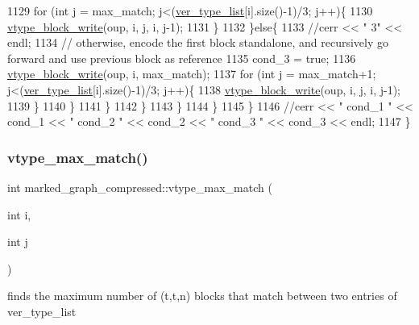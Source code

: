 \begin{DoxyCode}
1129               \textcolor{keywordflow}{for} (\textcolor{keywordtype}{int} j = max\_match; j<(\hyperlink{classmarked__graph__compressed_af2e3e55223d436628a02758dfae88493}{ver\_type\_list}[i].size()-1)/3; j++)\{
1130                 \hyperlink{classmarked__graph__compressed_a31f9ea72682f9072d0f90faf58a603fe}{vtype\_block\_write}(oup, i, j, i, j-1);
1131               \}
1132             \}\textcolor{keywordflow}{else}\{
1133               \textcolor{comment}{//cerr << " 3" << endl;}
1134               \textcolor{comment}{// otherwise, encode the first block standalone, and recursively go forward and use previous
       block as reference}
1135               cond\_3 = \textcolor{keyword}{true};
1136               \hyperlink{classmarked__graph__compressed_a31f9ea72682f9072d0f90faf58a603fe}{vtype\_block\_write}(oup, i, max\_match);
1137               \textcolor{keywordflow}{for} (\textcolor{keywordtype}{int} j = max\_match+1; j<(\hyperlink{classmarked__graph__compressed_af2e3e55223d436628a02758dfae88493}{ver\_type\_list}[i].size()-1)/3; j++)\{
1138                 \hyperlink{classmarked__graph__compressed_a31f9ea72682f9072d0f90faf58a603fe}{vtype\_block\_write}(oup, i, j, i, j-1);
1139               \}
1140             \}
1141           \}
1142         \}
1143       \}
1144     \}
1145   \}
1146   \textcolor{comment}{//cerr << " cond\_1 " << cond\_1 << " cond\_2 " << cond\_2 << " cond\_3 " << cond\_3 << endl;}
1147 \}
\end{DoxyCode}
\mbox{\label{classmarked__graph__compressed_a5ce51414e335d817f4be781fdcfbe9b1}} 
\subsubsection{\texorpdfstring{vtype\+\_\+max\+\_\+match()}{vtype\_max\_match()}}
{\footnotesize\ttfamily int marked\+\_\+graph\+\_\+compressed\+::vtype\+\_\+max\+\_\+match (\begin{DoxyParamCaption}\item[{int}]{i,  }\item[{int}]{j }\end{DoxyParamCaption})}



finds the maximum number of (t,t\textquotesingle{},n) blocks that match between two entries of ver\+\_\+type\+\_\+list 


